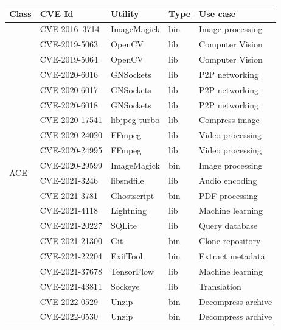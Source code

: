 \begin{table}[!t]
	\centering
	\setlength{\tabcolsep}{3mm}
	\begin{tabular*}{0.85\columnwidth}{ l l l l l}
	  \toprule
	  {\bf Class} & {\bf CVE Id} & {\bf Utility} & {\bf Type} & {\bf Use case}\\
          \midrule
	  \multirow{25}{*}{ACE}                     & CVE-2016–3714    & ImageMagick    & bin & Image processing    \\
						    & CVE-2019-5063    & OpenCV         & lib & Computer Vision     \\
						    & CVE-2019-5064    & OpenCV         & lib & Computer Vision     \\
						    & CVE-2020-6016    & GNSockets      & lib & P2P networking      \\ 
						    & CVE-2020-6017    & GNSockets      & lib & P2P networking      \\ 
						    & CVE-2020-6018    & GNSockets      & lib & P2P networking      \\
						    & CVE-2020-17541   & libjpeg-turbo  & lib & Compress image      \\
						    & CVE-2020-24020   & FFmpeg         & lib & Video processing    \\
						    & CVE-2020-24995   & FFmpeg         & lib & Video processing    \\
						    & CVE-2020-29599   & ImageMagick    & bin & Image processing    \\
						    & CVE-2021-3246    & libsndfile     & lib & Audio encoding      \\
						    & CVE-2021-3781    & Ghostscript    & bin & PDF processing      \\
							& CVE-2021-4118    & Lightning      & lib & Machine learning    \\
						    & CVE-2021-20227   & SQLite         & lib & Query database      \\
						    & CVE-2021-21300   & Git            & bin & Clone repository    \\
						    & CVE-2021-22204   & ExifTool       & bin & Extract metadata    \\
						    & CVE-2021-37678   & TensorFlow     & lib & Machine learning    \\
							& CVE-2021-43811   & Sockeye        & lib & Translation         \\
						    & CVE-2022-0529    & Unzip          & bin & Decompress archive  \\
						    & CVE-2022-0530    & Unzip          & bin & Decompress archive  \\

\end{tabular*}
\end{table}
